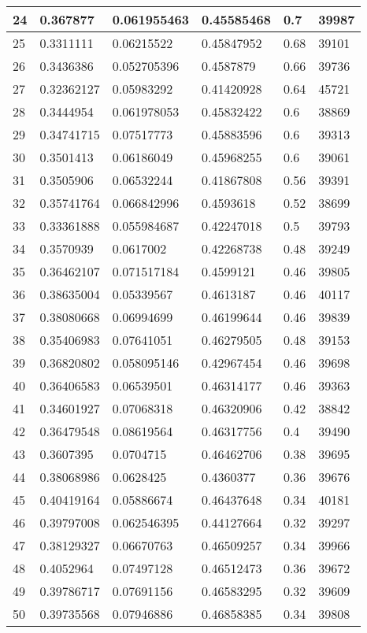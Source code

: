 \begin{longtable}{|l|l|l|l|l|l|}
24 & 0.367877 & 0.061955463 & 0.45585468 & 0.7 & 39987 \\ \hline 
25 & 0.3311111 & 0.06215522 & 0.45847952 & 0.68 & 39101 \\ \hline 
26 & 0.3436386 & 0.052705396 & 0.4587879 & 0.66 & 39736 \\ \hline 
27 & 0.32362127 & 0.05983292 & 0.41420928 & 0.64 & 45721 \\ \hline 
28 & 0.3444954 & 0.061978053 & 0.45832422 & 0.6 & 38869 \\ \hline 
29 & 0.34741715 & 0.07517773 & 0.45883596 & 0.6 & 39313 \\ \hline 
30 & 0.3501413 & 0.06186049 & 0.45968255 & 0.6 & 39061 \\ \hline 
31 & 0.3505906 & 0.06532244 & 0.41867808 & 0.56 & 39391 \\ \hline 
32 & 0.35741764 & 0.066842996 & 0.4593618 & 0.52 & 38699 \\ \hline 
33 & 0.33361888 & 0.055984687 & 0.42247018 & 0.5 & 39793 \\ \hline 
34 & 0.3570939 & 0.0617002 & 0.42268738 & 0.48 & 39249 \\ \hline 
35 & 0.36462107 & 0.071517184 & 0.4599121 & 0.46 & 39805 \\ \hline 
36 & 0.38635004 & 0.05339567 & 0.4613187 & 0.46 & 40117 \\ \hline 
37 & 0.38080668 & 0.06994699 & 0.46199644 & 0.46 & 39839 \\ \hline 
38 & 0.35406983 & 0.07641051 & 0.46279505 & 0.48 & 39153 \\ \hline 
39 & 0.36820802 & 0.058095146 & 0.42967454 & 0.46 & 39698 \\ \hline 
40 & 0.36406583 & 0.06539501 & 0.46314177 & 0.46 & 39363 \\ \hline 
41 & 0.34601927 & 0.07068318 & 0.46320906 & 0.42 & 38842 \\ \hline 
42 & 0.36479548 & 0.08619564 & 0.46317756 & 0.4 & 39490 \\ \hline 
43 & 0.3607395 & 0.0704715 & 0.46462706 & 0.38 & 39695 \\ \hline 
44 & 0.38068986 & 0.0628425 & 0.4360377 & 0.36 & 39676 \\ \hline 
45 & 0.40419164 & 0.05886674 & 0.46437648 & 0.34 & 40181 \\ \hline 
46 & 0.39797008 & 0.062546395 & 0.44127664 & 0.32 & 39297 \\ \hline 
47 & 0.38129327 & 0.06670763 & 0.46509257 & 0.34 & 39966 \\ \hline 
48 & 0.4052964 & 0.07497128 & 0.46512473 & 0.36 & 39672 \\ \hline 
49 & 0.39786717 & 0.07691156 & 0.46583295 & 0.32 & 39609 \\ \hline 
50 & 0.39735568 & 0.07946886 & 0.46858385 & 0.34 & 39808 \\ \hline 
\end{longtable}